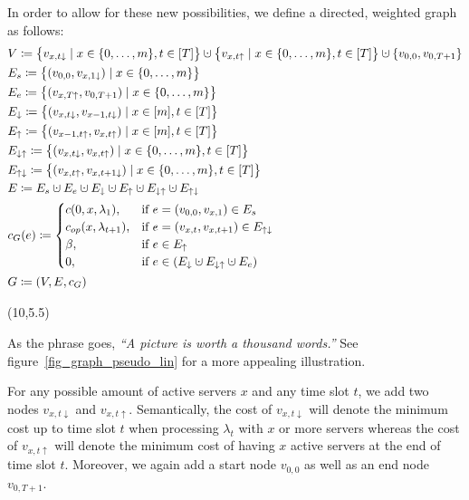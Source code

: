 \documentclass[hidelinks]{article}
\theoremstyle{plain}
\theoremstyle{definition}
\theoremstyle{rem}
\newcommand{\costs}{c}
\newcommand{\opcosts}{c_{op}}
\newcommand{\fromto}[2]{\{#1,\ldots,#2\}}
\newcommand{\dotcup}{\mathbin{\mathaccent\cdot\cup}}
\begin{document}
In order to allow for these new possibilities, we define a directed, weighted graph as follows:
\begin{align*}
	&V\coloneqq\bigl\{v_{x,t\downarrow}\mid x\in\fromto{0}{m},t\in[T]\bigr\}\dotcup\bigl\{v_{x,t\uparrow}\mid x\in\fromto{0}{m},t\in[T]\bigr\}\dotcup\{v_{0,0},v_{0,T+1}\}\\
	&E_s\coloneqq\bigl\{(v_{0,0},v_{x,1\downarrow})\mid x\in\fromto{0}{m}\bigr\}\\
	&E_e\coloneqq\bigl\{(v_{x,T\uparrow},v_{0,T+1})\mid x\in\fromto{0}{m}\bigr\}\\
	&E_\downarrow\coloneqq\bigl\{(v_{x,t\downarrow},v_{x-1,t\downarrow})\mid x\in[m],t\in[T]\bigr\}\\
	&E_\uparrow\coloneqq\bigl\{(v_{x-1,t\uparrow},v_{x,t\uparrow})\mid x\in[m],t\in[T]\bigr\}\\
	&E_{\downarrow\uparrow}\coloneqq\bigl\{(v_{x,t\downarrow},v_{x,t\uparrow})\mid x\in\fromto{0}{m},t\in[T]\bigr\}\\
	&E_{\uparrow\downarrow}\coloneqq\bigl\{(v_{x,t\uparrow},v_{x,t+1\downarrow})\mid x\in\fromto{0}{m},t\in[T]\bigr\}\\
	&E\coloneqq E_s\dotcup E_e\dotcup E_\downarrow\dotcup E_\uparrow\dotcup E_{\downarrow\uparrow}\dotcup E_{\uparrow\downarrow}\\
	&c_G(e)\coloneqq
	\begin{cases}
		\costs(0,x,\lambda_1), & \text{if $e=(v_{0,0},v_{x,1})\in E_s$}\\
		\opcosts(x,\lambda_{t+1}), & \text{if $e=(v_{x,t},v_{x,t+1})\in E_{\uparrow\downarrow}$}\\
		\beta, & \text{if $e\in E_\uparrow$}\\
		0, & \text{if $e\in(E_\downarrow\dotcup E_{\downarrow\uparrow}\dotcup E_e)$}
	\end{cases}\\
	&G\coloneqq(V,E,c_G)
\end{align*}
\begin{textblock}{3}(10,5.5)
\begin{framed}
As the phrase goes, \textit{``A picture is worth a thousand words.''} See figure~\ref{fig_graph_pseudo_lin} for a more appealing illustration.%
\end{framed}
\end{textblock}
For any possible amount of active servers $x$ and any time slot $t$, we add two nodes $v_{x,t\downarrow}$ and $v_{x,t\uparrow}$. Semantically, the cost of $v_{x,t\downarrow}$ will denote the minimum cost up to time slot $t$ when processing $\lambda_t$ with $x$ or more servers whereas the cost of $v_{x,t\uparrow}$ will denote the minimum cost of having $x$ active servers at the end of time slot $t$. Moreover, we again add a start node $v_{0,0}$ as well as an end node $v_{0,T+1}$. 
\end{document}

